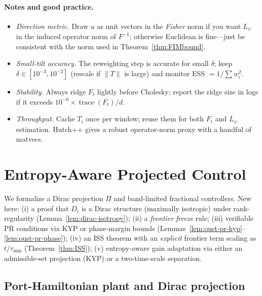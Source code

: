 \documentclass[10pt]{article}
\begin{document}
\paragraph{Notes and good practice.}
\begin{itemize}[leftmargin=*]
\item \emph{Direction metric.} Draw $u$ as unit vectors in the \emph{Fisher} norm if you want \(L_\psi\) in the induced operator norm of \(F^{-1}\); otherwise Euclidean is fine—just be consistent with the norm used in Theorem~\ref{thm:FIMbound}.
\item \emph{Small-tilt accuracy.} The reweighting step is accurate for small \(\delta\); keep \(\delta\in[10^{-3},10^{-2}]\) (rescale if \(\|T\|\) is large) and monitor ESS \(= 1/\sum w_i^2\).
\item \emph{Stability.} Always ridge \(F_t\) lightly before Cholesky; report the ridge size in logs if it exceeds \(10^{-6}\times\operatorname{trace}(F_t)/d\).
\item \emph{Throughput.} Cache \(T_i\) once per window; reuse them for both \(F_t\) and \(L_\psi\) estimation. Hutch++ gives a robust operator-norm proxy with a handful of matvecs.
\end{itemize}

\section{Entropy-Aware Projected Control}\label{sec:control}

We formalize a Dirac projection $\Pi$ and band-limited fractional controllers. New here: 
(i) a proof that $D_i$ is a Dirac structure (maximally isotropic) under rank-regularity (Lemma~\ref{lem:dirac-isotropy}); 
(ii) a \emph{frontier freeze} rule; 
(iii) verifiable PR conditions via KYP or phase-margin bounds (Lemmas~\ref{lem:oust-pr-kyp}--\ref{lem:oust-pr-phase}); 
(iv) an ISS theorem with an \emph{explicit} frontier term scaling as $t/\tau_{\min}$ (Theorem~\ref{thm:ISS}); 
(v) entropy-aware gain adaptation via either an admissible-set projection (KYP) or a two-time-scale separation.

\setcounter{definition}{5}
\setcounter{lemma}{6}
\setcounter{theorem}{2}

\subsection{Port-Hamiltonian plant and Dirac projection}
\end{document}
